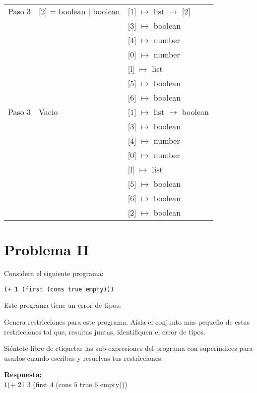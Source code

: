 \documentclass{article}
\begin{document}
\begin{center}
\begin{longtable}{ | l | p{10 cm} | p{5 cm} | }
 Paso 3 & [$\boxed{2}$] = boolean $|$ boolean				& [$\boxed{1}$] $\mapsto$ list $\rightarrow$ [$\boxed{2}$] \\
	&	& [$\boxed{3}$] $\mapsto$ boolean \\
	&	& [$\boxed{4}$] $\mapsto$ number \\
	&	& [0] $\mapsto$ number \\ 
	&	& [l] $\mapsto$ list \\
	&	& [$\boxed{5}$] $\mapsto$ boolean \\ 
	&	& [$\boxed{6}$] $\mapsto$ boolean \\ \hline
 
 Paso 3 & Vacio & [$\boxed{1}$] $\mapsto$ list $\rightarrow$ boolean \\
	&	& [$\boxed{3}$] $\mapsto$ boolean \\
	&	& [$\boxed{4}$] $\mapsto$ number \\
	&	& [0] $\mapsto$ number \\ 
	&	& [l] $\mapsto$ list \\
	&	& [$\boxed{5}$] $\mapsto$ boolean \\ 
	&	& [$\boxed{6}$] $\mapsto$ boolean \\ 
	&	& [$\boxed{2}$] $\mapsto$ boolean \\ \hline
\end{longtable}

\end{center}

\section*{Problema II}
Considera el siguiente programa:

\begin{verbatim}
(+ 1 (first (cons true empty)))
\end{verbatim}

Este programa tiene un error de tipos.

Genera restricciones para este programa. Aísla el conjunto mas pequeño de
estas restricciones tal que, resultas juntas, identifiquen el error de tipos.

Siéntete libre de etiquetar las sub-expresiones del programa con superíndices
para usarlos cuando escribas y resuelvas tus restricciones.

\textbf {Respuesta: }
\\
$\boxed{1}$(+ $\boxed{2}$1  $\boxed{3}$ (first $\boxed{4}$ (cons $\boxed{5}$ true $\boxed{6}$ empty)))
\end{document}
